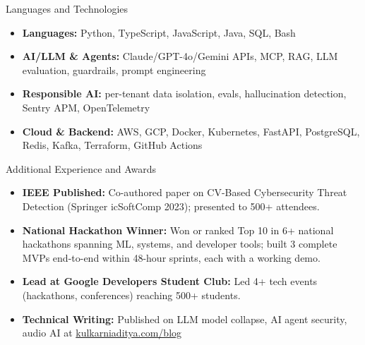 \documentclass[]{mcdowellcv}
\begin{document}
\begin{cvsection}{Languages and Technologies}
  \begin{cvsubsection}{}{}{}
    \begin{itemize}
      \item \textbf{Languages:} Python, TypeScript, JavaScript, Java, SQL, Bash
      \item \textbf{AI/LLM \& Agents:} Claude/GPT-4o/Gemini APIs, MCP, RAG, LLM evaluation, guardrails, prompt engineering
      \item \textbf{Responsible AI:} per-tenant data isolation, evals, hallucination detection, Sentry APM, OpenTelemetry
      \item \textbf{Cloud \& Backend:} AWS, GCP, Docker, Kubernetes, FastAPI, PostgreSQL, Redis, Kafka, Terraform, GitHub Actions
    \end{itemize}
  \end{cvsubsection}
\end{cvsection}

\begin{cvsection}{Additional Experience and Awards}
  \begin{cvsubsection}{}{}{}
    \begin{itemize}
      \item \textbf{IEEE Published:} Co-authored paper on CV-Based Cybersecurity Threat Detection (Springer icSoftComp 2023); presented to 500+ attendees.
      \item \textbf{National Hackathon Winner:} Won or ranked Top 10 in 6+ national hackathons spanning ML, systems, and developer tools; built 3 complete MVPs end-to-end within 48-hour sprints, each with a working demo.
      \item \textbf{Lead at Google Developers Student Club:} Led 4+ tech events (hackathons, conferences) reaching 500+ students.
      \item \textbf{Technical Writing:} Published on LLM model collapse, AI agent security, audio AI at \href{https://www.kulkarniaditya.com/blog}{kulkarniaditya.com/blog}
    \end{itemize}
  \end{cvsubsection}
\end{cvsection}
\end{document}
